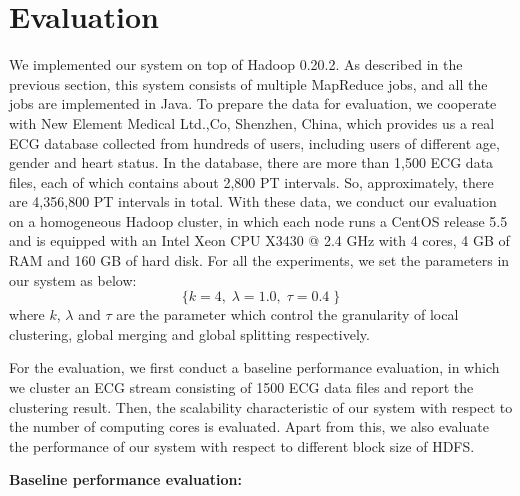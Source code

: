 \documentclass[conference]{IEEEtran}
\begin{document}
\section{Evaluation}
We implemented our system on top of Hadoop 0.20.2. As described in the previous section, this system consists of multiple MapReduce jobs, and all the jobs are implemented in Java. To prepare the data for evaluation, we cooperate with New Element Medical Ltd.,Co, Shenzhen, China, which provides us a real ECG database collected from hundreds of users, including users of different age, gender and heart status. In the database, there are more than 1,500 ECG data files, each of which contains about 2,800 PT intervals. So, approximately, there are 4,356,800 PT intervals in total. With these data, we conduct our evaluation on a homogeneous Hadoop cluster, in which each node runs a CentOS release 5.5 and is equipped with an Intel Xeon CPU X3430 @ 2.4 GHz with 4 cores, 4 GB of RAM and 160 GB of hard disk. For all the experiments, we set the parameters in our system as below:
\begin{equation}
\{ k=4, \; \lambda=1.0, \; \tau=0.4 \;  \}
\end{equation}
where $ k $, $ \lambda $ and $ \tau $ are the parameter which control the granularity of local clustering, global merging and global splitting respectively.


For the evaluation, we first conduct a baseline performance evaluation, in which we cluster an ECG stream consisting of 1500 ECG data files and report the clustering result. Then, the scalability characteristic of our system with respect to the number of computing cores is evaluated. Apart from this, we also evaluate the performance of our system with respect to different block size of HDFS. 

\textbf{Baseline performance evaluation:}
\end{document}
